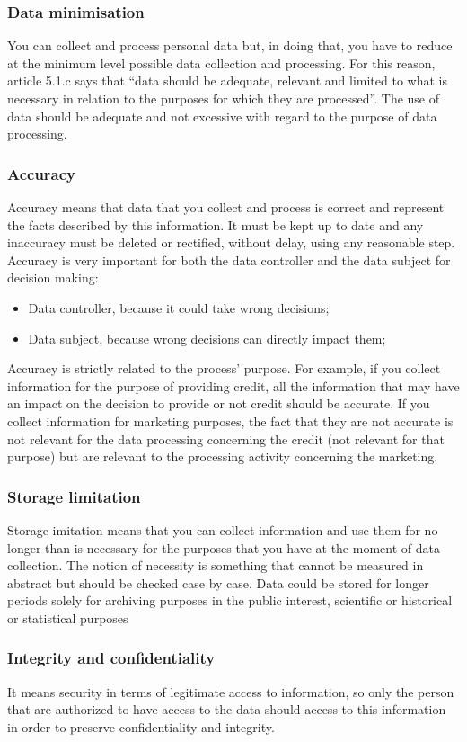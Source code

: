 \subsubsection{Data minimisation}
You can collect and process personal data but, in doing that, you have to reduce at the minimum level possible data collection and processing. For this reason, article 5.1.c says that “data should be adequate, relevant and limited to what is necessary in relation to the purposes for which they are processed”. The use of data should be adequate and not excessive with regard to the purpose of data processing.

\subsubsection{Accuracy}
Accuracy means that data that you collect and process is correct and represent the facts described by this information. It must be kept up to date and any inaccuracy must be deleted or rectified, without delay, using any reasonable step. Accuracy is very important for both the data controller and the data subject for decision making:
\begin{itemize}
    \item Data controller, because it could take wrong decisions;
    \item Data subject, because wrong decisions can directly impact them;
\end{itemize}
Accuracy is strictly related to the process' purpose. For example, if you collect information for the purpose of providing credit, all the information that may have an impact on the decision to provide or not credit should be accurate. If you collect information for marketing purposes, the fact that they are not accurate is not relevant for the data processing concerning the credit (not relevant for that purpose) but are relevant to the processing activity concerning the marketing.
\subsubsection{Storage limitation}
Storage imitation means that you can collect information and use them for no longer than is necessary for the purposes that you have at the moment of data collection. The notion of necessity is something that cannot be measured in abstract but should be checked case by case. Data could be stored for longer periods solely for archiving purposes in the public interest, scientific or historical or statistical purposes
\subsubsection{Integrity and confidentiality}
It means security in terms of legitimate access to information, so only the person that are authorized to have access to the data should access to this information in order to preserve confidentiality and integrity.
